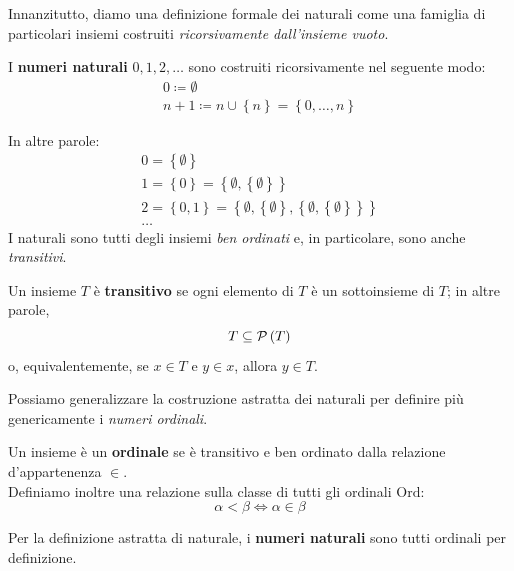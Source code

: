 Innanzitutto, diamo una definizione formale dei naturali come una famiglia di particolari insiemi costruiti \textit{ricorsivamente dall'insieme vuoto}.
\begin{define}
	I \textbf{numeri naturali} $0,1,2,\ldots$ sono costruiti ricorsivamente nel seguente modo:
	\begin{equation}
		\begin{array}{l}
			0\coloneqq \emptyset\\
			n+1\coloneqq n\cup \left\{n\right\} = \left\{0,\ldots,n\right\}
		\end{array}
	\end{equation}
\end{define}
In altre parole:
\begin{equation*}
	\begin{array}{l}
		0=\left\{\emptyset\right\}\\
		1=\left\{0\right\}=\left\{\emptyset,\left\{\emptyset\right\}\right\}\\
		2=\left\{0,1\right\}=\left\{\emptyset,\left\{\emptyset\right\}, \left\{\emptyset,\left\{\emptyset\right\}\right\}\right\}\\
		\dots
	\end{array}
\end{equation*}
I naturali sono tutti degli insiemi \textit{ben ordinati} e, in particolare, sono anche \textit{transitivi}.
\begin{define}[Transitività]
	Un insieme $T$ è \textbf{transitivo} se ogni elemento di $T$ è un sottoinsieme di $T$; in altre parole,
	\begin{equation}
		T\subseteq \mathcal{P}\left(T\right)
	\end{equation}
	o, equivalentemente, se $x\in T$ e $y\in x$, allora $y\in T$.
\end{define}
Possiamo generalizzare la costruzione astratta dei naturali per definire più genericamente i \textit{numeri ordinali}.
\begin{define}[Ordinale]
	Un insieme è un \textbf{ordinale} se è transitivo e ben ordinato dalla relazione d'appartenenza $\in$.\\
	Definiamo inoltre una relazione sulla classe di tutti gli ordinali $\mathrm{Ord}$:
	\begin{equation}
		\alpha<\beta\iff\alpha\in\beta
	\end{equation}
\end{define}
\begin{example}
	Per la definizione astratta di naturale, i \textbf{numeri naturali} sono tutti ordinali per definizione.
\end{example}
